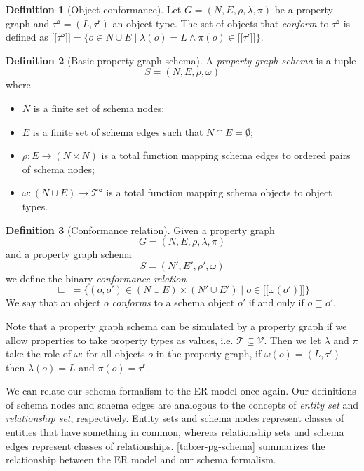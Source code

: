\documentclass{report}
\theoremstyle{definition}
\newtheorem{definition}{Definition}
\newcommand{\ptypes}{\mathcal{T}}
\newcommand{\rtype}{\tau^\mathsf{r}}
\newcommand{\otype}{\tau^\mathsf{o}}
\newcommand{\otypes}{\mathcal{T}^\mathsf{o}}
\newcommand{\lsem}{\ensuremath{[\![}}
\newcommand{\rsem}{\ensuremath{]\!]}}
\newcommand{\sem}[1]{\ensuremath{\lsem #1 \rsem}}
\newcommand{\conf}{\sqsubseteq}
\begin{document}
\begin{definition}[Object conformance]
  \label{def:object-conformance}
  Let $G = (N, E, \rho, \lambda, \pi)$ be a property graph and $\otype = (L, \rtype)$ an object type. The set of objects that \emph{conform} to $\otype$ is defined as $\sem{\otype} = \{o \in N \cup E \mid \lambda(o) = L \wedge \pi(o) \in \sem{\rtype}\}$.
\end{definition}

\begin{definition}[Basic property graph schema]
  \label{def:pg-schema-basic}
  A \emph{property graph schema} is a tuple $$S = (N, E, \rho, \omega)$$ where
  \begin{itemize}
    \item $N$ is a finite set of schema nodes;
    \item $E$ is a finite set of schema edges such that $N \cap E = \emptyset$;
    \item $\rho : E \to (N \times N)$ is a total function mapping schema edges to ordered pairs of schema nodes;
    \item $\omega : (N \cup E) \to \otypes$ is a total function mapping schema objects to object types.
  \end{itemize}
\end{definition}

\begin{definition}[Conformance relation]
  Given a property graph $$G = (N, E, \rho, \lambda, \pi)$$ and a property graph schema $$S = (N', E', \rho', \omega)$$ we define the binary \emph{conformance relation} $$\conf \; = \{(o, o') \in (N \cup E) \times (N' \cup E') \mid o \in \sem{\omega(o')}\}$$ We say that an object $o$ \emph{conforms} to a schema object $o'$ if and only if $o \conf o'$.
\end{definition}

Note that a property graph schema can be simulated by a property graph if we allow properties to take property types as values, i.e. $\ptypes \subseteq \mathcal{V}$. Then we let $\lambda$ and $\pi$ take the role of $\omega$: for all objects $o$ in the property graph, if $\omega(o) = (L, \rtype)$ then $\lambda(o) = L$ and $\pi(o) = \rtype$.

We can relate our schema formalism to the ER model once again. Our definitions of schema nodes and schema edges are analogous to the concepts of \emph{entity set} and \emph{relationship set}, respectively. Entity sets and schema nodes represent classes of entities that have something in common, whereas relationship sets and schema edges represent classes of relationships. \autoref{tab:er-pg-schema} summarizes the relationship between the ER model and our schema formalism.
\end{document}
